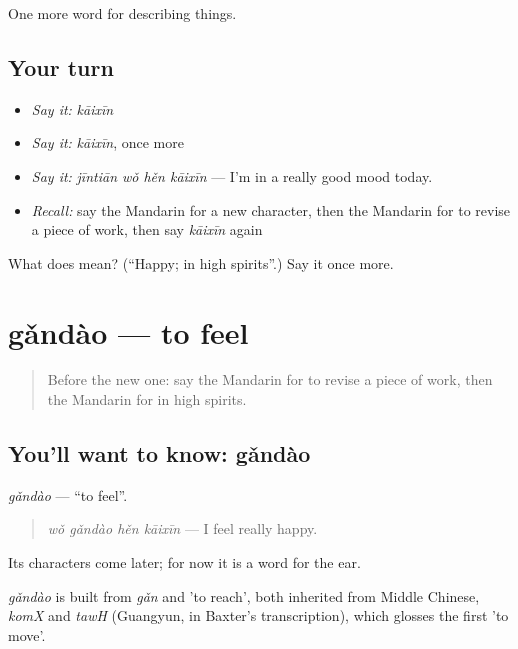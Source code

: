 \begin{grammarlens}[title={What you've built}]
One more word for describing things.
\end{grammarlens}

\subsection*{Your turn}
\begin{itemize}
\raggedright
  \item \emph{Say it:} \emph{kāixīn}
  \item \emph{Say it:} \emph{kāixīn}, once more
  \item \emph{Say it:} \emph{jīntiān wǒ hěn kāixīn} — I'm in a really good mood today.
  \item \emph{Recall:} say the Mandarin for a new character, then the Mandarin for to revise a piece of work, then say \emph{kāixīn} again
\end{itemize}

\begin{tcolorbox}[breakable,colback=teal!4,colframe=teal!35!black,title={Before you move on}]
What does  mean? (\textquotedblleft{}Happy; in high spirits\textquotedblright{}.) Say it once more.
\end{tcolorbox}
\section[gǎndào]{gǎndào — to feel}

\label{lesson:ZH-C252-gandao}



\begin{quote}
Before the new one: say the Mandarin for to revise a piece of work, then the Mandarin for in high spirits.
\end{quote}

\subsection*{You'll want to know: gǎndào}
\emph{gǎndào} — \textquotedblleft{}to feel\textquotedblright{}.

\begin{quote}
\emph{wǒ gǎndào hěn kāixīn} — I feel really happy.
\end{quote}

Its characters come later; for now it is a word for the ear.

\begin{cousinweb}
\emph{gǎndào} is built from \emph{gǎn} and  'to reach', both inherited from Middle Chinese, \emph{komX} and \emph{tawH} (Guangyun, in Baxter's transcription), which glosses the first 'to move'.
\end{cousinweb}

